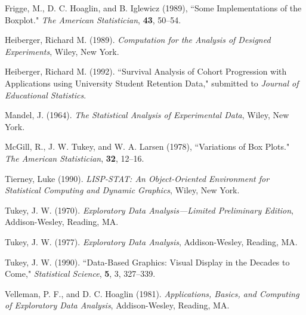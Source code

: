 \begin{description}
\item Frigge, M., D. C. Hoaglin, and B. Iglewicz (1989), ``Some Implementations
of the Boxplot." {\it The American Statistician}, {\bf 43}, 50--54.

\item Heiberger, Richard M. (1989).  {\it Computation for
    the Analysis of Designed Experiments}, Wiley, New York.

\item Heiberger, Richard M. (1992).
``Survival Analysis of Cohort Progression with Applications using University
Student Retention Data,"
submitted to {\it Journal of Educational Statistics}.


\item Mandel, J. (1964). {\it The Statistical Analysis of
Experimental Data}, Wiley, New York.

\item McGill, R., J. W. Tukey, and W. A. Larsen (1978),
``Variations of Box Plots." {\em The American Statistician},
{\bf 32}, 12--16.


\item Tierney, Luke (1990). {\it LISP-STAT: An Object-Oriented Environment
for Statistical Computing and Dynamic Graphics}, Wiley, New York.

\item Tukey, J. W. (1970). {\it Exploratory Data Analysis---Limited
Preliminary Edition}, Addison-Wesley, Reading, MA.

\item Tukey, J. W. (1977). {\it Exploratory Data Analysis},
Addison-Wesley, Reading, MA.

\item Tukey, J. W. (1990). ``Data-Based Graphics: Visual
Display in the Decades to Come," {\it Statistical Science},
{\bf 5}, 3, 327--339.


\item  Velleman, P. F., and D. C. Hoaglin (1981). {\it
Applications, Basics, and Computing of Exploratory Data
Analysis}, Addison-Wesley, Reading, MA.


\end{description}

